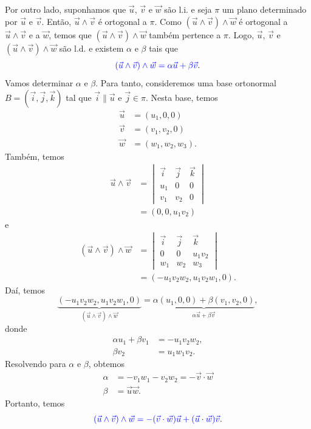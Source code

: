 Por outro lado, suponhamos que $\vec{u}$, $\vec{v}$ e $\vec{w}$ são l.i. e seja $\pi$ um plano determinado por $\vec{u}$ e $\vec{v}$. Então, $\vec{u}\land\vec{v}$ é ortogonal a $\pi$. Como $(\vec{u}\land\vec{v})\land\vec{w}$ é ortogonal a $\vec{u}\land\vec{v}$ e a $\vec{w}$, temos que $(\vec{u}\land\vec{v})\land\vec{w}$ também pertence a $\pi$. Logo, $\vec{u}$, $\vec{v}$ e $(\vec{u}\land\vec{v})\land\vec{w}$ são l.d. e existem $\alpha$ e $\beta$ tais que
\begin{equation}
  {\color{blue}(\vec{u}\land\vec{v})\land\vec{w} = \alpha\vec{u} + \beta\vec{v}}.
\end{equation}
Vamos determinar $\alpha$ e $\beta$. Para tanto, consideremos uma base ortonormal $B = (\vec{i}, \vec{j}, \vec{k})$ tal que $\vec{i}\parallel\vec{u}$ e $\vec{j}\in\pi$. Nesta base, temos
\begin{align}
  \vec{u} &= (u_1,0,0)\\
  \vec{v} &= (v_1,v_2,0)\\
  \vec{w} &= (w_1,w_2,w_3).
\end{align}
Também, temos
\begin{align}
  \vec{u}\land\vec{v} &=
  \begin{vmatrix}
    \vec{i} & \vec{j} & \vec{k} \\
    u_1 & 0 & 0 \\
    v_1 & v_2 & 0
  \end{vmatrix} \\
  &= (0,0,u_1v_2)
\end{align}
e
\begin{align}
  (\vec{u}\land\vec{v})\land\vec{w} &=
                                      \begin{vmatrix}
                                        \vec{i} & \vec{j} & \vec{k} \\
                                        0 & 0 & u_1v_2 \\
                                        w_1 & w_2 & w_3
                                      \end{vmatrix}\\
                                    &= (-u_1v_2w_2,u_1v_2w_1,0).
\end{align}
Daí, temos
\begin{equation}
  \underbrace{(-u_1v_2w_2,u_1v_2w_1,0)}_{(\vec{u}\land\vec{v})\land\vec{w}} = \underbrace{\alpha(u_1,0,0)+\beta(v_1,v_2,0)}_{\alpha\vec{u}+\beta\vec{v}},
\end{equation}
donde
\begin{align}
  \alpha u_1+\beta v_1 &= -u_1v_2w_2,\\
  \beta v_2 &= u_1w_1v_2.  
\end{align}
Resolvendo para $\alpha$ e $\beta$, obtemos
\begin{align}
  \alpha &= -v_1w_1-v_2w_2 = -\vec{v}\cdot\vec{w}\\
  \beta &= \vec{u}\vec{w}.
\end{align}
Portanto, temos
\begin{equation}
  {\color{blue}(\vec{u}\land\vec{v})\land\vec{w} = -(\vec{v}\cdot\vec{w})\vec{u}+(\vec{u}\cdot\vec{w})\vec{v}}.
\end{equation}

